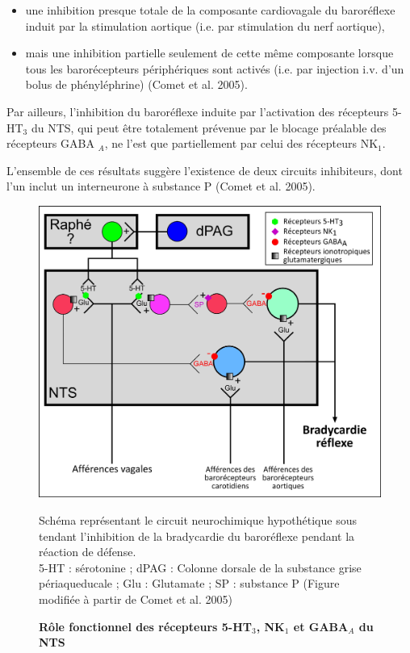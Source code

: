 \documentclass[a4paper,12pt,twoside]{report}
\begin{document}
\begin{itemize}
\item une inhibition presque totale de la composante cardiovagale du baroréflexe induit par la stimulation aortique (i.e. par stimulation du nerf aortique), 
\item mais une inhibition partielle seulement de cette même composante lorsque tous les barorécepteurs périphériques sont activés (i.e. par injection i.v. d’un bolus de phényléphrine) (Comet et al. 2005). 
\end{itemize}

Par ailleurs, l’inhibition du baroréflexe induite par l’activation des récepteurs 5-HT$_{3}$ du NTS, qui peut être totalement prévenue par le blocage préalable des récepteurs GABA $_{A}$, ne l’est que partiellement par celui des récepteurs NK$_{1}$. 

L’ensemble de ces résultats suggère l’existence de deux circuits inhibiteurs, dont l’un inclut un interneurone à substance P (Comet et al. 2005).

\begin{figure}[t]

\begin{center}
 \includegraphics[width=16cm]{Figure10.jpg} 
\end{center}

\caption{\textbf{Rôle fonctionnel des récepteurs 5-HT$_{3}$, NK$_{1}$ et GABA$_{A}$ du NTS}}

{\protect\parbox[t]{18cm}{
\begin{small}
Schéma représentant le circuit neurochimique hypothétique sous tendant l’inhibition de la bradycardie du baroréflexe pendant la réaction de défense.\\ 
5-HT : sérotonine ; dPAG : Colonne dorsale de la substance grise périaqueducale ; Glu : Glutamate ; SP : substance P (Figure modifiée à partir de Comet et al. 2005)
\end{small}}}

\label{Figure 10}

\end{figure}
\end{document}
